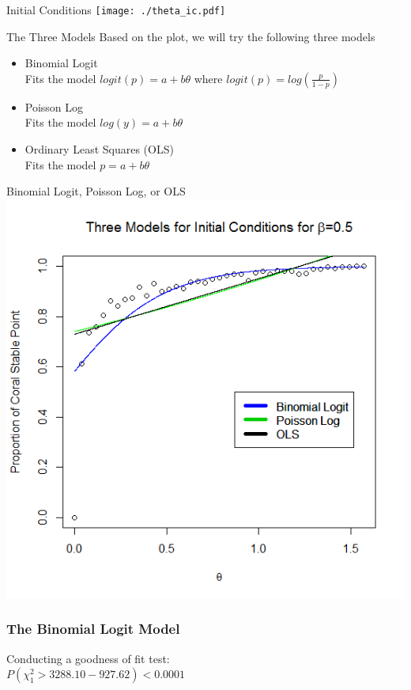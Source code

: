 \begin{frame}{Initial Conditions}
\texttt{[image: ./theta\_ic.pdf]}
\end{frame}

\begin{frame}{The Three Models}
Based on the plot, we will try the following three models
\begin{itemize}
\item Binomial Logit\\
Fits the model $logit(p)=a+b\theta$ where $logit(p)=log(\frac{p}{1-p})$\\
\item Poisson Log\\
Fits the model $log(y)=a+b\theta$\\
\item Ordinary Least Squares (OLS)\\
Fits the model $p=a+b\theta$\\
\end{itemize}
\end{frame}


\begin{frame}{Binomial Logit, Poisson Log, or OLS}
\includegraphics[scale=.425]{theta_three_models.png}
\end{frame}

\begin{frame}\frametitle{The Binomial Logit Model}
{\fontsize{8}{3} \color{blue} }

Conducting a goodness of fit test: \\
$P(\chi^{2}_{1}>3288.10-927.62)<0.0001$\\

\end{frame}


